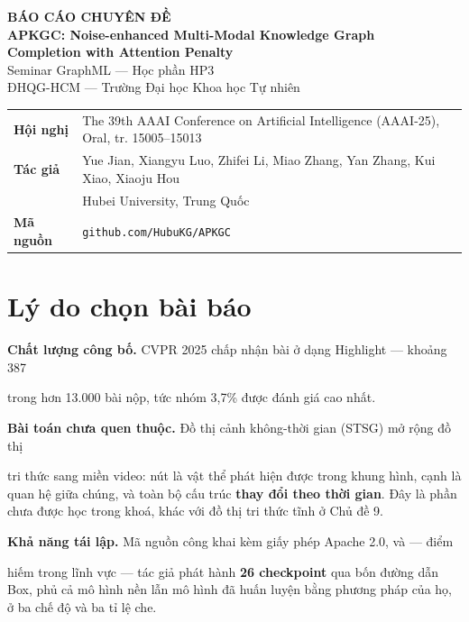 \documentclass[11pt,a4paper]{article}
\begin{document}
\begin{center}
  {\sffamily\LARGE\bfseries\color{hcmusblue} BÁO CÁO CHUYÊN ĐỀ}\\[8pt]
  {\sffamily\large\bfseries APKGC: Noise-enhanced Multi-Modal Knowledge Graph\\
   Completion with Attention Penalty}\\[10pt]
  {\small Seminar GraphML --- Học phần HP3}\\[2pt]
  {\small ĐHQG-HCM --- Trường Đại học Khoa học Tự nhiên}
\end{center}

\vspace{4pt}
\begin{center}\small
\begin{tabular}{@{}ll@{}}
  \toprule
  \textbf{Hội nghị} & The 39th AAAI Conference on Artificial Intelligence
                      (AAAI-25), Oral, tr. 15005--15013\\
  \textbf{Tác giả}  & Yue Jian, Xiangyu Luo, Zhifei Li, Miao Zhang, Yan Zhang,
                      Kui Xiao, Xiaoju Hou\\
                    & Hubei University, Trung Quốc\\
  \textbf{Mã nguồn} & \texttt{github.com/HubuKG/APKGC}\\
  \bottomrule
\end{tabular}
\end{center}

\vspace{6pt}
\section{Lý do chọn bài báo}
\textbf{Chất lượng công bố.} CVPR 2025 chấp nhận bài ở dạng Highlight --- khoảng 387

trong hơn 13.000 bài nộp, tức nhóm 3,7\% được đánh giá cao nhất.

\textbf{Bài toán chưa quen thuộc.} Đồ thị cảnh không-thời gian (STSG) mở rộng đồ thị

tri thức sang miền video: nút là vật thể phát hiện được trong khung hình, cạnh là quan hệ giữa chúng, và toàn bộ cấu trúc \textbf{thay đổi theo thời gian}. Đây là phần chưa được học trong khoá, khác với đồ thị tri thức tĩnh ở Chủ đề 9.

\textbf{Khả năng tái lập.} Mã nguồn công khai kèm giấy phép Apache 2.0, và --- điểm

hiếm trong lĩnh vực --- tác giả phát hành \textbf{26 checkpoint} qua bốn đường dẫn Box, phủ cả mô hình nền lẫn mô hình đã huấn luyện bằng phương pháp của họ, ở ba chế độ và ba tỉ lệ che.
\end{document}
